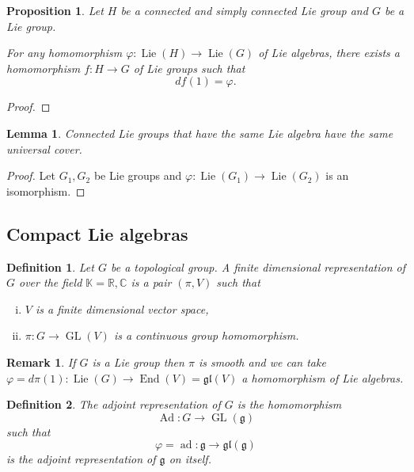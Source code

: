 \documentclass{article}
\newtheorem{proposition}{Proposition}[section]
\newtheorem{definition}{Definition}[section]
\newtheorem{lemma}{Lemma}[section]
\newtheorem{remark}{Remark}[section]
\numberwithin{equation}{section}
\DeclareMathOperator{\Ad}{Ad}
\DeclareMathOperator{\ad}{ad}
\DeclareMathOperator{\End}{End}
\DeclareMathOperator{\GL}{GL}
\DeclareMathOperator{\Lie}{Lie}
\begin{document}
\begin{proposition}
Let $H$ be a connected and simply connected Lie group and $G$ be a Lie group.\\
\par For any homomorphism $\varphi:\Lie(H)\to\Lie(G)$ of Lie algebras, there exists a homomorphism $f:H\to G$ of Lie groups such that
\begin{equation*}
d f(1) = \varphi.
\end{equation*}
\end{proposition}

\begin{proof}
\end{proof}

\begin{lemma}
Connected Lie groups that have the same Lie algebra have the same universal cover.
\end{lemma}

\begin{proof}
Let $G_1,G_2$ be Lie groups and $\varphi:\Lie(G_1)\to\Lie(G_2)$ is an isomorphism. %
\end{proof}

\subsection{Compact Lie algebras}

\begin{definition}
Let $G$ be a topological group. A finite dimensional representation of $G$ over the field $\mathbb{K}=\mathbb{R},\mathbb{C}$ is a pair $(\pi,V)$ such that
\begin{enumerate}[i).]
\item $V$ is a finite dimensional vector space,
\item $\pi:G\to\GL(V)$ is a continuous group homomorphism. %
\end{enumerate}
\end{definition}

\begin{remark}
If $G$ is a Lie group then $\pi$ is smooth and we can take $\varphi=d\pi(1):\Lie(G)\to\End(V)=\mathfrak{gl}(V)$ a homomorphism of Lie algebras.
\end{remark}

\begin{definition}
The adjoint representation of $G$ is the homomorphism 
\begin{equation*}
\Ad:G\to\GL(\mathfrak{g})
\end{equation*}
such that 
\begin{equation*}
\varphi=\ad:\mathfrak{g}\to\mathfrak{gl}(\mathfrak{g})
\end{equation*}
is the adjoint representation of $\mathfrak{g}$ on itself.%
\end{definition}
\end{document}
